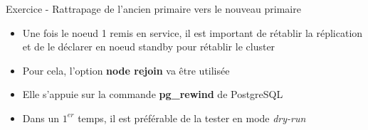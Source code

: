 \begin{frame}[fragile]{Exercice - Rattrapage de l'ancien primaire vers le nouveau primaire}

   \begin{itemize}
      \item Une fois le noeud 1 remis en service, il est important de rétablir la réplication et de le déclarer en noeud standby pour rétablir le cluster
      \item Pour cela, l'option \textbf{node rejoin} va être utilisée
      \item Elle s'appuie sur la commande \textbf{pg\_rewind} de PostgreSQL
      \item Dans un $1^{er}$ temps, il est préférable de la tester en mode \textit{dry-run}
   \end{itemize}

\begin{toile}
\end{toile}

\end{frame}


